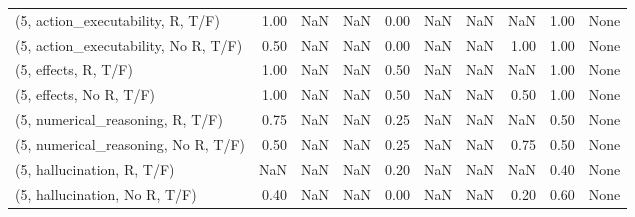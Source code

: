 \begin{table*}[h!]
\begin{adjustbox}{width=2\columnwidth,center}
\begin{tabular}{lrrr|rrr|rrr}
(5, action\_executability, R, T/F)    &                      1.00 &                   NaN &                       NaN &                          0.00 &                       NaN &                           NaN &                                    NaN &                               1.00 &                                  None \\
(5, action\_executability, No R, T/F) &                      0.50 &                   NaN &                       NaN &                          0.00 &                       NaN &                           NaN &                                   1.00 &                               1.00 &                                  None \\
(5, effects, R, T/F)                 &                      1.00 &                   NaN &                       NaN &                          0.50 &                       NaN &                           NaN &                                    NaN &                               1.00 &                                  None \\
(5, effects, No R, T/F)              &                      1.00 &                   NaN &                       NaN &                          0.50 &                       NaN &                           NaN &                                   0.50 &                               1.00 &                                  None \\
(5, numerical\_reasoning, R, T/F)     &                      0.75 &                   NaN &                       NaN &                          0.25 &                       NaN &                           NaN &                                    NaN &                               0.50 &                                  None \\
(5, numerical\_reasoning, No R, T/F)  &                      0.50 &                   NaN &                       NaN &                          0.25 &                       NaN &                           NaN &                                   0.75 &                               0.50 &                                  None \\
(5, hallucination, R, T/F)           &                       NaN &                   NaN &                       NaN &                          0.20 &                       NaN &                           NaN &                                    NaN &                               0.40 &                                  None \\
(5, hallucination, No R, T/F)        &                      0.40 &                   NaN &                       NaN &                          0.00 &                       NaN &                           NaN &                                   0.20 &                               0.60 &                                  None \\

\end{tabular}
\end{adjustbox}
\end{table*}

